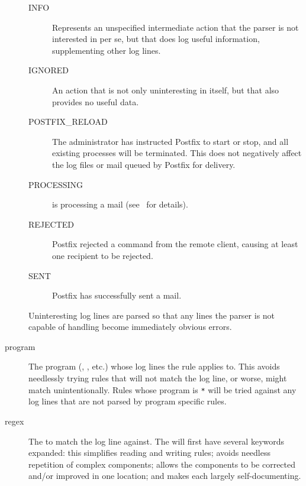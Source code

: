 \begin{description}
\begin{description}
            \item [INFO] Represents an unspecified intermediate action that
                the parser is not interested in per se, but that does log
                useful information, supplementing other log lines.

            \item [IGNORED] An action that is not only uninteresting in
                itself, but that also provides no useful data.

            \item [POSTFIX\_RELOAD] The administrator has instructed
                Postfix to start or stop, and all existing 
                processes will be terminated.  This does not negatively
                affect the log files or mail queued by Postfix for
                delivery.

            \item [PROCESSING]  is processing a mail
                (see~\cite{postfix-cleanup} for details).

            \item [REJECTED] Postfix rejected a command from the remote
                client, causing at least one recipient to be rejected.

            \item [SENT] Postfix has successfully sent a mail.

        \end{description}

        Uninteresting log lines are parsed so that any lines the parser
        is not capable of handling become immediately obvious errors.

    \item [program] The program (, , etc.) whose
        log lines the rule applies to.  This avoids needlessly trying rules
        that will not match the log line, or worse, might match
        unintentionally.  Rules whose program is \texttt{*} will be tried
        against any log lines that are not parsed by program specific
        rules.

    \item [regex] The \regex{} to match the log line against.  The \regex{}
        will first have several keywords expanded: this simplifies reading
        and writing rules; avoids needless repetition of complex \regex{}
        components; allows the components to be corrected and/or improved
        in one location; and makes each \regex{} largely self-documenting.


\end{description}
